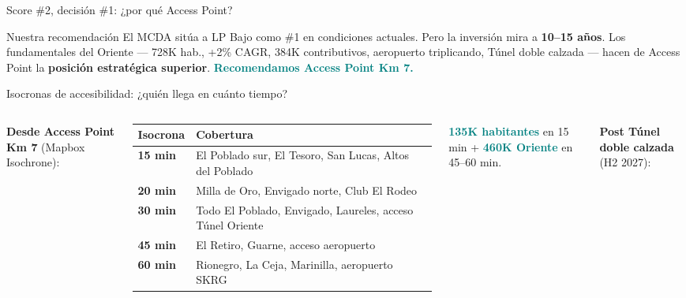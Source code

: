 \documentclass[aspectratio=169, 11pt]{beamer}
\newcommand{\highlight}[1]{\textcolor{teal}{\textbf{#1}}}
\begin{document}
{\begin{frame}{Score \#2, decisión \#1: ¿por qué Access Point?}
\vspace{4pt}
\begin{alertblock}{\small Nuestra recomendación}
\scriptsize
El MCDA sitúa a LP Bajo como \#1 en condiciones actuales. Pero la inversión mira a \textbf{10--15 años}. Los fundamentales del Oriente --- 728K hab., +2\% CAGR, 384K contributivos, aeropuerto triplicando, Túnel doble calzada --- hacen de Access Point la \textbf{posición estratégica superior}. \highlight{Recomendamos Access Point Km 7.}
\end{alertblock}
\end{frame}
}

\begin{frame}{Isocronas de accesibilidad: ¿quién llega en cuánto tiempo?}

\begin{columns}[T]
\vspace{4pt}
{\small\textbf{Desde Access Point Km 7} (Mapbox Isochrone):}

\vspace{6pt}
{\scriptsize
\begin{tabular}{@{}lp{5cm}@{}}
\toprule
\textbf{Isocrona} & \textbf{Cobertura} \\
\midrule
\rowcolor{teal!10}
\textbf{15 min} & El Poblado sur, El Tesoro, San Lucas, Altos del Poblado \\
\textbf{20 min} & Milla de Oro, Envigado norte, Club El Rodeo \\
\rowcolor{teal!6}
\textbf{30 min} & Todo El Poblado, Envigado, Laureles, acceso Túnel Oriente \\
\textbf{45 min} & El Retiro, Guarne, acceso aeropuerto \\
\rowcolor{amber!8}
\textbf{60 min} & Rionegro, La Ceja, Marinilla, aeropuerto SKRG \\
\bottomrule
\end{tabular}
}

\vspace{4pt}
{\footnotesize \highlight{135K habitantes} en 15 min + \highlight{460K Oriente} en 45--60 min.}

\vspace{4pt}
{\small\textbf{Post Túnel doble calzada} (H2 2027):}


\end{columns}
\end{frame}
\end{document}
